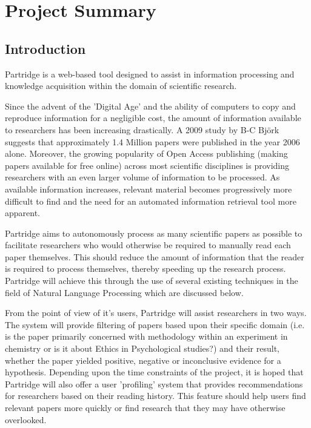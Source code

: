\documentclass[12pt,a4paper]{article}
\begin{document}



\setlength{\parindent}{0pt}
\setlength{\parskip}{1.5ex plus 0.5ex minus 0.2ex}

\tableofcontents

\pagebreak

\section{Project Summary}

\subsection{Introduction}
Partridge is a web-based tool designed to assist in information processing and knowledge
acquisition within the domain of scientific research.

Since the advent of the 'Digital Age' and the ability of computers to copy and
reproduce information for a negligible cost, the amount of information
available to researchers has been increasing drastically.  A 2009 study by B-C
Bj\"{o}rk suggests that approximately 1.4 Million papers were published in the
year 2006 alone\cite{bjork2009}. Moreover, the growing popularity of Open Access
publishing (making papers available for free online\cite{Suber2012}) across
most scientific disciplines\cite{bjork2009}\cite{harnad2004comparing} is
providing researchers with an even larger volume of information to be
processed. As available information increases, relevant material becomes
progressively more difficult to find and the need for an automated information
retrieval tool more apparent.

Partridge aims to autonomously process as many scientific papers as possible to
facilitate researchers who would otherwise be required to manually read each
paper themselves. This should reduce the amount of information that the reader
is required to process themselves, thereby speeding up the research process.
Partridge will achieve this through the use of several existing techniques in
the field of Natural Language Processing which are discussed below.

From the point of view of it's users, Partridge will assist researchers in two
ways. The system will provide filtering of papers based upon their
specific domain (i.e. is the paper primarily concerned with methodology within
an experiment in chemistry or is it about Ethics in Psychological studies?) and
their result, whether the paper yielded positive, negative or inconclusive
evidence for a hypothesis. Depending upon the time constraints of the
project, it is hoped that Partridge will also offer a user 'profiling' system
that provides recommendations for researchers based on their reading history.
This feature should help users find relevant papers more quickly or find research that
they may have otherwise overlooked.
\end{document}
